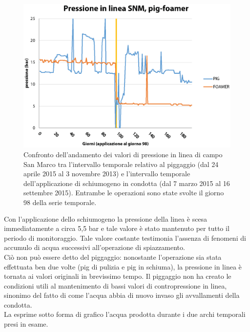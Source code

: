 \begin{figure}[htbp]
    \centering
    \includegraphics[width=\textwidth]{fig/test/graphs/pig-foamer-pressione.eps}
    \caption{Confronto dell'andamento dei valori di pressione in linea di campo San Marco tra l'intervallo temporale relativo al piggaggio (dal 24 aprile 2015 al 3 novembre 2013) e l'intervallo temporale dell'applicazione di schiumogeno in condotta (dal 7 marzo 2015 al 16 settembre 2015). Entrambe le operazioni sono state svolte il giorno 98 della serie temporale.} 
    \label{fig:pig-foamer-pressione}
\end{figure}
Con l'applicazione dello schiumogeno la pressione della linea è scesa immediatamente  a circa 5,5 bar e tale valore è stato mantenuto per tutto il periodo di monitoraggio. Tale valore costante testimonia l'assenza di fenomeni di accumulo di acqua successivi all'operazione di spiazzamento.\\
Ciò non può essere detto  del piggaggio: nonostante l'operazione sia stata effettuata ben due volte (pig di pulizia e pig in schiuma), la pressione in linea è tornata ai valori originali in brevissimo tempo. Il piggaggio non ha creato le condizioni utili al mantenimento di bassi valori di contropressione in linea, sinonimo del fatto di come l'acqua abbia di nuovo invaso gli avvallamenti della condotta.\\
La  esprime sotto forma di grafico l'acqua prodotta durante i due archi temporali presi in esame.
